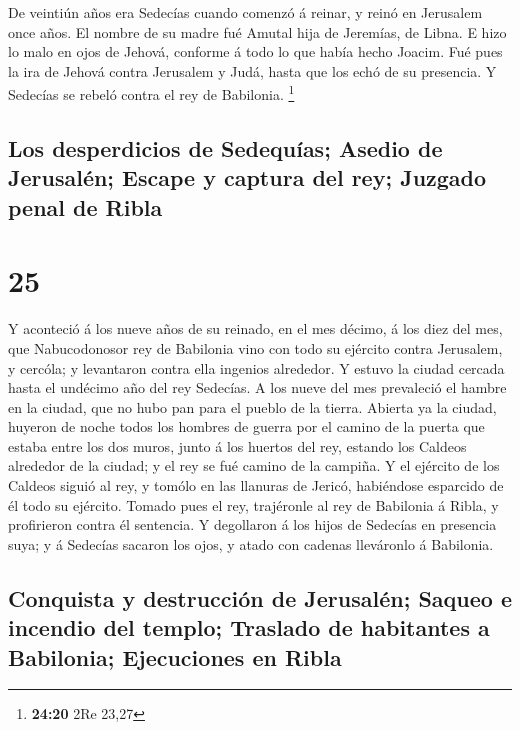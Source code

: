  De veintiún años era Sedecías cuando comenzó á reinar, y
reinó en Jerusalem once años. El nombre de su madre fué Amutal hija de
Jeremías, de Libna.  E hizo lo malo en ojos de Jehová,
conforme á todo lo que había hecho Joacim.  Fué pues la
ira de Jehová contra Jerusalem y Judá, hasta que los echó de su
presencia. Y Sedecías se rebeló contra el rey de Babilonia. \footnote{\textbf{24:20}
  2Re 23,27}

\hypertarget{los-desperdicios-de-sedequuxedas-asedio-de-jerusaluxe9n-escape-y-captura-del-rey-juzgado-penal-de-ribla}{%
\subsection{Los desperdicios de Sedequías; Asedio de Jerusalén; Escape y
captura del rey; Juzgado penal de
Ribla}\label{los-desperdicios-de-sedequuxedas-asedio-de-jerusaluxe9n-escape-y-captura-del-rey-juzgado-penal-de-ribla}}

\hypertarget{section-24}{%
\section{25}\label{section-24}}

 Y aconteció á los nueve años de su reinado, en el mes
décimo, á los diez del mes, que Nabucodonosor rey de Babilonia vino con
todo su ejército contra Jerusalem, y cercóla; y levantaron contra ella
ingenios alrededor.  Y estuvo la ciudad cercada hasta el
undécimo año del rey Sedecías.  A los nueve del mes
prevaleció el hambre en la ciudad, que no hubo pan para el pueblo de la
tierra.  Abierta ya la ciudad, huyeron de noche todos los
hombres de guerra por el camino de la puerta que estaba entre los dos
muros, junto á los huertos del rey, estando los Caldeos alrededor de la
ciudad; y el rey se fué camino de la campiña.  Y el
ejército de los Caldeos siguió al rey, y tomólo en las llanuras de
Jericó, habiéndose esparcido de él todo su ejército. 
Tomado pues el rey, trajéronle al rey de Babilonia á Ribla, y
profirieron contra él sentencia.  Y degollaron á los hijos
de Sedecías en presencia suya; y á Sedecías sacaron los ojos, y atado
con cadenas lleváronlo á Babilonia.

\hypertarget{conquista-y-destrucciuxf3n-de-jerusaluxe9n-saqueo-e-incendio-del-templo-traslado-de-habitantes-a-babilonia-ejecuciones-en-ribla}{%
\subsection{Conquista y destrucción de Jerusalén; Saqueo e incendio del
templo; Traslado de habitantes a Babilonia; Ejecuciones en
Ribla}\label{conquista-y-destrucciuxf3n-de-jerusaluxe9n-saqueo-e-incendio-del-templo-traslado-de-habitantes-a-babilonia-ejecuciones-en-ribla}}

